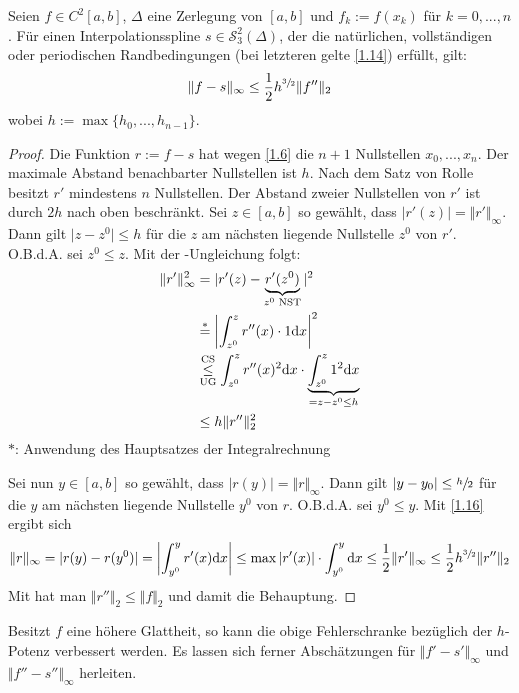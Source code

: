 \begin{proposition}
	Seien $f\in C^2[a,b]$, $\Delta$ eine Zerlegung von $[a,b]$ und $f_k:=f(x_k)$ für $k=0,...,n$. Für einen Interpolationsspline $s\in\mathcal{S}^2_3(\Delta)$, der die natürlichen, vollständigen oder periodischen Randbedingungen (bei letzteren gelte \cref{1.14}) erfüllt, gilt:
	\begin{align}
		\Vert f-s\Vert_\infty \le \frac{1}{2}h^{\sfrac{3}{2}}\Vert f''\Vert_2\notag
	\end{align}
	wobei $h:=\max\{h_0,...,h_{n-1}\}$.
\end{proposition}
\begin{proof}
	Die Funktion $r:=f-s$ hat wegen \cref{1.6} die $n+1$ Nullstellen $x_0,...,x_n$. Der maximale Abstand benachbarter Nullstellen ist $h$. Nach dem Satz von Rolle besitzt $r'$ mindestens $n$ Nullstellen. Der Abstand zweier Nullstellen von $r'$ ist durch $2h$ nach oben beschränkt. Sei $z\in [a,b]$ so gewählt, dass $\vert r'(z)\vert=\Vert r'\Vert_\infty$. Dann gilt $\vert z-z^0\vert\le h$ für die $z$ am nächsten liegende Nullstelle $z^0$ von $r'$. O.B.d.A. sei $z^0\le z$. Mit der -Ungleichung folgt:
	\begin{align}
		\label{1.16}
		\begin{split}
		\Vert r'\Vert_\infty^2 &= \vert r'(z)-\underbrace{r'(z^0)}_{z^0\text{ NST}}\vert^2 \\
		&\overset{\ast}{=} \left|\int_{z^0}^z r''(x)\cdot 1\mathrm{d} x\right|^2  \\
		&\overset{\tiny{\text{CS}}}{\underset{\tiny{\text{UG}}}{\le}} \int_{z^0}^z r''(x)^2\mathrm{d} x\cdot \underbrace{\int_{z^0}^z 1^2\mathrm{d} x}_{=z-z^0\le h} \\
		&\le h\Vert r''\Vert_2^2
		\end{split}
	\end{align}
	$\ast$: Anwendung des Hauptsatzes der Integralrechnung
	
	
	Sei nun $y\in[a,b]$ so gewählt, dass $\vert r(y)\vert=\Vert r\Vert_\infty$. Dann gilt $\vert y-y_0\vert\le \sfrac{h}{2}$ für die $y$ am nächsten liegende Nullstelle $y^0$ von $r$. O.B.d.A. sei $y^0\le y$. Mit \cref{1.16} ergibt sich
	\begin{align}
		\Vert r\Vert_\infty = \vert r(y)-r(y^0)\vert=\left|\int_{y^0}^y r'(x)\mathrm{d} x\right|\le\max\vert r'(x)\vert\cdot \int_{y^0}^y \mathrm{d} x\le \frac{1}{2}\Vert r'\Vert_\infty\le \frac{1}{2}h^{\sfrac{3}{2}}\Vert r''\Vert_2\notag
	\end{align}
	Mit  hat man $\Vert r''\Vert_2\le \Vert f\Vert_2$ und damit die Behauptung.
\end{proof}

\begin{remark}
	Besitzt $f$ eine höhere Glattheit, so kann die obige Fehlerschranke bezüglich der $h$-Potenz verbessert werden. Es lassen sich ferner Abschätzungen für $\Vert f'-s'\Vert_\infty$ und $\Vert f''-s''\Vert_\infty$ herleiten.
\end{remark}
